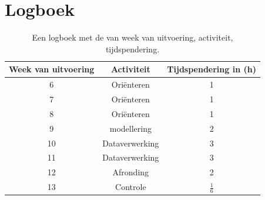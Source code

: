 \documentclass[numbers=endperiod]{scrartcl}
\begin{document}
\newpage
\appendix
\section{Logboek}
\begin{table}[ht]
\centering
\caption{Een logboek met de van week van uitvoering, activiteit, tijdspendering.}
\begin{tabular}{Scc}
\toprule
{Week van uitvoering} & Activiteit & Tijdspendering in (\si{\hour})\\
 & Oriënteren & 1\\
7 & Oriënteren & 1\\
8 & Oriënteren & 1\\
9 & modellering & 2\\
10 & Dataverwerking & 3\\
11 & Dataverwerking & 3\\
12 & Afronding & 2\\
13 & Controle & $\frac{1}{6}$\\
\bottomrule
\end{tabular}
\end{table}
\end{document}
